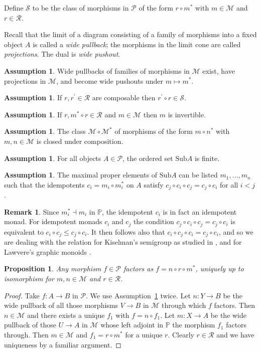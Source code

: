 \documentclass[a4paper,12pt,reqno]{amsart}
\newtheorem{proposition}[theorem]{Proposition}
\theoremstyle{definition}
\newtheorem{remark}[theorem]{Remark}
\newtheorem{assumption}[theorem]{Assumption}
\theoremstyle{fact}
\theoremstyle{genquest}
\theoremstyle{step}
\newcommand{\ra}{\rightarrow}
\def\CM{{\mathscr M}}
\def\CP{{\mathscr P}}
\def\CR{{\mathscr R}}
\def\CS{{\mathscr S}}
\begin{document}
Define $\CS$ to be the class of morphisms in $\CP$ of the form $r\circ m^*$ with
$m\in \CM$ and $r\in \CR$. 

Recall that the limit of a diagram consisting of a family of morphisms into
a fixed object $A$ is called a {\em wide pullback}; the morphisms in the
limit cone are called {\em projections}. 
The dual is {\em wide pushout}.  

\begin{assumption}\label{ass1}
Wide pullbacks of families of morphisms in $\CM$ exist, have projections in $\CM$, and become wide pushouts under $m \mapsto m^*$.
\end{assumption}
\begin{assumption}\label{ass2}
If $r, r^{\prime}\in \CR$ are composable then $r^{\prime}\circ r \in \CS$. 
\end{assumption}
\begin{assumption}\label{ass3}
If $r,m^*\circ r \in \CR$ and $m\in \CM$ then $m$ is invertible.
\end{assumption}
\begin{assumption}\label{ass4}
The class $\CM \circ \CM^*$ of morphisms of the form $m\circ n^*$ with $m,n\in \CM$ is closed under composition.
\end{assumption}
\begin{assumption}\label{ass5}
For all objects $A\in \CP$, the ordered set $\mathrm{Sub}A$ is finite. 
\end{assumption}
\begin{assumption}\label{ass6}
The maximal proper elements of $\mathrm{Sub}A$ can be listed $m_1, \dots, m_n$ 
such that the idempotents $c_i = m_i \circ m_i^*$ on $A$ satisfy 
$c_j\circ c_i\circ c_j=c_j\circ c_i$ for all $i< j$. 
\end{assumption}

\begin{remark}
Since $m_i^*\dashv m_i$ in $\mathbb{P}$, the idempotent $c_i$ is in fact an idempotent monad.
For idempotent monads $c_i$ and $c_j$ the condition $c_j\circ c_i\circ c_j=c_j\circ c_i$
is equivalent to $c_i\circ c_j\le c_j\circ c_i$.
It then follows also that $c_i\circ c_j\circ c_i=c_j\circ c_i$, and so we are dealing with the relation for Kiselman's semigroup as studied in \cite{KM09}, and for Lawvere's graphic monoids \cite{Law91}. 
\end{remark}

\begin{proposition}\label{factorize}
Any morphism $f\in \CP$ factors as $f=n\circ r\circ m^*$, uniquely up to isomorphism
for $m,n\in \CM$ and $r\in \CR$. 
\end{proposition}
\begin{proof}
Take $f : A \ra B$ in $\CP$. We use Assumption~\ref{ass1} twice.
Let $n:Y\ra B$ be the wide pullback of all those morphisms 
$V\ra B$ in $\CM$ through which $f$ factors.
Then $n\in \CM$ and there exists a unique $f_1$ with $f = n\circ f_1$.
Let $m:X\ra A$ be the wide pullback of those $U\ra A$ in $\CM$ 
whose left adjoint in $\mathbb{P}$ the morphism $f_1$ factors through.
Then $m\in \CM$ and $f_1 = r \circ m^*$ for a unique $r$.
Clearly $r\in \CR$ and we have uniqueness by a familiar argument. 
\end{proof}
\end{document}
